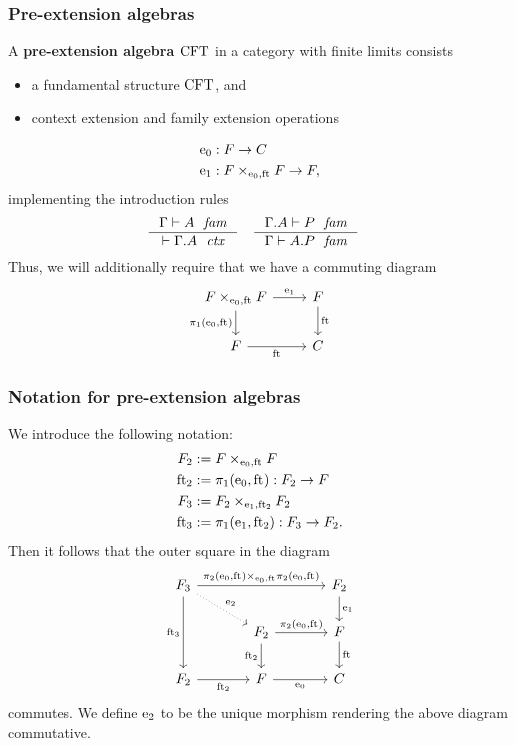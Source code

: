 \documentclass[handout]{beamer}
\newcommand\important[1]{\textbf{\color{red!90!black}#1}}
\begin{document}
\begin{frame}
\frametitle{\bf Pre-extension algebras}
A \important{pre-extension algebra $\mathrm{CFT}$} in a category with finite limits consists
\begin{itemize}
\item a fundamental structure $\mathrm{CFT}$, and
\item context extension and family extension operations
\end{itemize}
\begin{align*}
\ectxext%
  &%
: \stesysf \to \stesysc%
  \\
\efamext%
  &%
: \stesysff \to \stesysf,%
\end{align*}
\pause
implementing the introduction rules
\begin{align*}
& \inference
  { \jfam{\Gamma}{A}
    }
  { \jctx{\ctxext{\Gamma}{A}}
    }
& & \inference
  { \jfam{{\Gamma}{A}}{P}
    }
  { \jfam{\Gamma}{\ctxext{A}{P}}
    }
\end{align*}
\pause
Thus, we will additionally require that we have a commuting diagram
\begin{equation*}
\begin{tikzcd}[ampersand replacement=\&]
\stesysff 
  \ar{r}{\efamext} 
  \ar{d}[swap]{\pullbackpr{1}{\ectxext}{\eft}} 
  \& 
\stesysf 
  \ar{d}{\eft}
  \\
\stesysf
  \ar{r}[swap]{\eft} 
  \& 
\stesysc
\end{tikzcd}
\end{equation*}
\end{frame}

\begin{frame}
\frametitle{\bf Notation for pre-extension algebras}
We introduce the following notation:
\begin{align*}
\stesysf_2 
  & := \stesysff
  \\
\eft[2] 
  & := \pullbackpr{1}{\ectxext}{\eft} : \stesysf_2\to\stesysf
  \\
\stesysf_3 & := \pullback{\stesysf_2}{\stesysf_2}{\efamext}{\eft[2]}
  \\
\eft[3]
  & := \pullbackpr{1}{\efamext}{\eft[2]} : \stesysf_3\to\stesysf_2.
\end{align*}
\pause
Then it follows that the outer square in the diagram
\begin{equation*}
\begin{tikzcd}[ampersand replacement=\&,column sep=large]
\stesysf_3
  \ar[dotted]{dr}{\eext{2}}
  \ar{rr}{\pullback{\pullbackpr{2}{\ectxext}{\eft}}{\pullbackpr{2}{\ectxext}{\eft}}{\ectxext}{\eft}}
  \ar{dd}[swap]{\eft[3]}
  \& 
  \&
\stesysf_2
  \ar{d}{\efamext}
  \\
  \&
\stesysf_2
  \ar{d}[swap]{\eft[2]}
  \ar{r}{\pullbackpr{2}{\ectxext}{\eft}}
  \&
\stesysf
  \ar{d}{\eft}
  \\
\stesysf_2
  \ar{r}[swap]{\eft[2]}
  \&
\stesysf
  \ar{r}[swap]{\ectxext}
  \&
\stesysc
\end{tikzcd}
\end{equation*}
commutes. \pause
We define \important{$\mathrm{e}_{2}$} to be the unique morphism rendering the above diagram
commutative. 
\end{frame}
\end{document}
